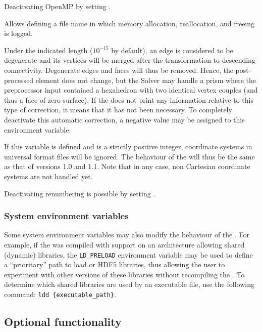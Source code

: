 {{{{Deactivating OpenMP by setting .


Allows defining a file name in which memory allocation, reallocation,
and freeing is logged.


Under the indicated length ($10^{-15}$ by default), an edge is considered
to be degenerate and its vertices will be merged after the transformation
to descending connectivity. Degenerate edges and faces will thus be
removed. Hence, the post-processed element does not change, but the
Solver may handle a prism where the preprocessor input contained a
hexahedron with two identical vertex couples (and thus a face of zero
surface). If the \pcs does not print any information relative to this
type of correction, it means that it has not been necessary. To completely
deactivate this automatic correction, a negative value may be assigned
to this environment variable.


If this variable is defined and is a strictly positive integer, coordinate
systems in \ideas universal format files will be ignored. The behaviour
of the \pcs will thus be the same as that of versions 1.0 and 1.1.
Note that in any case, non Cartesian coordinate systems are not handled yet.


Deactivating renumbering is possible by setting .


\subsubsection{System environment variables\label{sec:envpcs:sys}}

Some system environment variables may also modify the behaviour of
the \pcs. For example, if the \pcs was compiled with \med support
on an architecture allowing shared (dynamic) libraries, the
\texttt {LD\_PRELOAD} environment variable may be used to define a
``prioritary'' path to load \med or HDF5 libraries, thus allowing the user to experiment
with other versions of these libraries without recompiling the \pcs.
To determine which shared libraries are used by an executable file, use
the following command: \texttt{ldd~\{executable\_path\}}.

\subsection{Optional functionality\label{sec:pcs:lib_opt}}

}}}}
